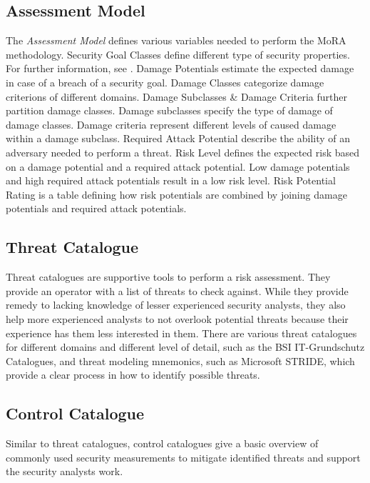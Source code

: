\subsection{Assessment Model}
\label{moraassmodel}
The \textit{Assessment Model} defines various variables needed to perform the MoRA \\methodology.
Security Goal Classes define different type of security properties. For further information, see \textit{}. 
Damage Potentials estimate the expected damage in case of a breach of a security goal.
Damage Classes categorize damage criterions of different domains. 
Damage Subclasses \& Damage Criteria further partition damage classes. Damage subclasses specify the type of damage of damage classes. Damage criteria represent different levels of caused damage within a damage subclass. 
Required Attack Potential describe the ability of an adversary needed to perform a threat.
Risk Level defines the expected risk based on a damage potential and a required attack potential. Low damage potentials and high required attack potentials result in a low risk level. 
Risk Potential Rating is a table defining how risk potentials are combined by joining damage potentials and required attack potentials. 


\subsection{Threat Catalogue}
\label{morathreatcat}

Threat catalogues are supportive tools to perform a risk assessment. They provide an operator with a list of threats to check against. While they provide remedy to lacking knowledge of lesser experienced security analysts, they also help more experienced analysts to not overlook potential threats because their experience has them less interested in them. There are various threat catalogues for different domains and different level of detail, such as the BSI IT-Grundschutz Catalogues\cite{bsicatalogues}, and threat modeling mnemonics, such as Microsoft STRIDE, which provide a clear process in how to identify possible threats.

\subsection{Control Catalogue}
\label{moracontrolcat}

Similar to threat catalogues, control catalogues give a basic overview of commonly used security measurements to mitigate identified threats and support the security analysts work. 


